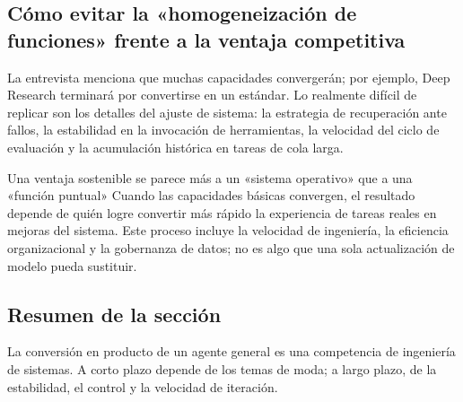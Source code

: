 \subsection{Cómo evitar la «homogeneización de funciones» frente a la ventaja competitiva}

La entrevista menciona que muchas capacidades convergerán; por ejemplo, Deep Research terminará por convertirse en un estándar. Lo realmente difícil de replicar son los detalles del ajuste de sistema: la estrategia de recuperación ante fallos, la estabilidad en la invocación de herramientas, la velocidad del ciclo de evaluación y la acumulación histórica en tareas de cola larga.

\begin{knowledgebox}{Una ventaja sostenible se parece más a un «sistema operativo» que a una «función puntual»}
Cuando las capacidades básicas convergen, el resultado depende de quién logre convertir más rápido la experiencia de tareas reales en mejoras del sistema. Este proceso incluye la velocidad de ingeniería, la eficiencia organizacional y la gobernanza de datos; no es algo que una sola actualización de modelo pueda sustituir.
\end{knowledgebox}

\subsection{Resumen de la sección}

La conversión en producto de un agente general es una competencia de ingeniería de sistemas. A corto plazo depende de los temas de moda; a largo plazo, de la estabilidad, el control y la velocidad de iteración.

